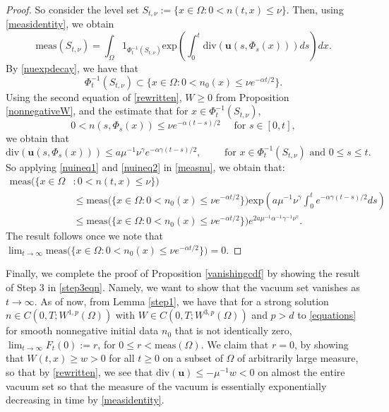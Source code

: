 \documentclass[12pt]{article}
\newcommand{\bd}{\boldsymbol}
\theoremstyle{plain}
\begin{document}
\begin{proof}
So consider the level set $S_{t, \nu} := \{x \in \Omega : 0 < n(t, x) \le \nu\}$. Then, using \eqref{measidentity}, we obtain
\begin{equation}\label{measnu}
\text{meas}(S_{t, \nu}) = \int_{\Omega} 1_{\Phi_{t}^{-1}(S_{t, \nu})} \text{exp}\left(\int_{0}^{t} \text{div}(\bd{u}(s, \Phi_{s}(x))) ds\right) dx.
\end{equation}
By \eqref{nuexpdecay}, we have that
\begin{equation}\label{nuineq1}
\Phi_{t}^{-1}(S_{t, \nu}) \subset \{x \in \Omega : 0 < n_{0}(x) \le \nu e^{-\alpha t/2}\}.
\end{equation}
Using the second equation of \eqref{rewritten}, $W \ge 0$ from Proposition \ref{nonnegativeW}, and the estimate that for $x \in \Phi_{t}^{-1}(S_{t, \nu})$, 
\begin{equation*}
0 < n(s, \Phi_{s}(x)) \le \nu e^{-\alpha(t - s)/2} \quad \text{ for } s \in [0, t],
\end{equation*}
we obtain that
\begin{equation}\label{nuineq2}
\text{div}(\bd{u}(s, \Phi_{s}(x))) \le a\mu^{-1}\nu^{\gamma} e^{-\alpha \gamma(t - s)/2}, \qquad \text{ for } x \in \Phi_{t}^{-1}(S_{t, \nu}) \text{ and } 0 \le s \le t.
\end{equation}
So applying \eqref{nuineq1} and \eqref{nuineq2} in \eqref{measnu}, we obtain that:
\begin{align*}
\text{meas}\Big(\{x \in \Omega &: 0 < n(t, x) \le \nu\}\Big) \\
&\le \text{meas}\Big(\{x \in \Omega : 0 < n_{0}(x) \le \nu e^{-\alpha t/2}\}\Big) \text{exp} \left(a\mu^{-1}\nu^{\gamma} \int_{0}^{t} e^{-\alpha \gamma (t - s)/2} ds\right) \\
&\le \text{meas}\Big(\{x \in \Omega : 0 < n_{0}(x) \le \nu e^{-\alpha t/2}\}\Big) e^{2a\mu^{-1}\alpha^{-1}\gamma^{-1}\nu^{\gamma}}.
\end{align*}
The result follows once we note that $\lim_{t \to \infty} \text{meas}\Big(\{x \in \Omega : 0 < n_{0}(x) \le \nu e^{-\alpha t/2}\}\Big) = 0$.
\end{proof}

Finally, we complete the proof of Proposition \ref{vanishingcdf} by showing the result of Step 3 in \eqref{step3eqn}. Namely, we want to show that the vacuum set vanishes as $t \to \infty$. As of now, from Lemma \ref{step1}, we have that for a strong solution $n \in C(0, T; W^{1, p}(\Omega))$ with $W \in C(0, T; W^{3, p}(\Omega))$ and $p > d$ to \eqref{equations} for smooth nonnegative initial data $n_0$ that is not identically zero, $\lim_{t \to \infty} F_{t}(0) := r$, for $0 \le r < \text{meas}(\Omega)$. We claim that $r = 0$, by showing that $W(t, x) \ge w > 0$ for all $t \ge 0$ on a subset of $\Omega$ of arbitrarily large measure, so that by \eqref{rewritten}, we see that $\text{div}(\bd{u}) \le -\mu^{-1}w < 0$ on almost the entire vacuum set so that the measure of the vacuum is essentially exponentially decreasing in time by \eqref{measidentity}. 
\end{document}
